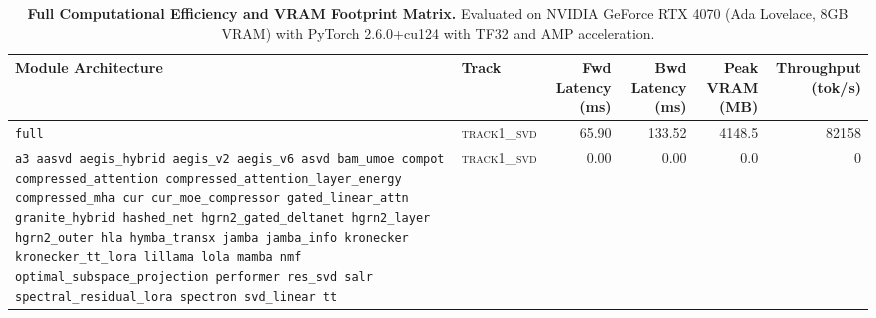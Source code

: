 \begin{table}[t]
\centering
\small
\caption{\textbf{Full Computational Efficiency and VRAM Footprint Matrix.} Evaluated on NVIDIA GeForce RTX 4070 (Ada Lovelace, 8GB VRAM) with PyTorch 2.6.0+cu124 with TF32 and AMP acceleration.}
\label{tab:efficiency_benchmark_results}
\begin{tabular}{l l r r r r}
\toprule
\textbf{Module Architecture} & \textbf{Track} & \textbf{Fwd Latency (ms)} & \textbf{Bwd Latency (ms)} & \textbf{Peak VRAM (MB)} & \textbf{Throughput (tok/s)} \\
\midrule
\texttt{full} & \textsc{track1\_svd} & 65.90 & 133.52 & 4148.5 & 82158 \\
\texttt{a3 aasvd aegis\_hybrid aegis\_v2 aegis\_v6 asvd bam\_umoe compot compressed\_attention compressed\_attention\_layer\_energy compressed\_mha cur cur\_moe\_compressor gated\_linear\_attn granite\_hybrid hashed\_net hgrn2\_gated\_deltanet hgrn2\_layer hgrn2\_outer hla hymba\_transx jamba jamba\_info kronecker kronecker\_tt\_lora lillama lola mamba nmf optimal\_subspace\_projection performer res\_svd salr spectral\_residual\_lora spectron svd\_linear tt} & \textsc{track1\_svd} & 0.00 & 0.00 & 0.0 & 0 \\
\bottomrule
\end{tabular}
\end{table}